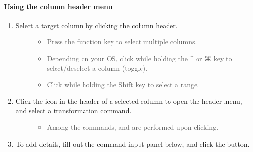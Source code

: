 \documentclass[letterpaper,10pt,english]{sphinxmanual}
\begin{document}
\paragraph{Using the column header menu}
\label{\detokenize{discovery/part07/edit_rules:id3}}\begin{enumerate}
\def\theenumi{\arabic{enumi}}
\def\labelenumi{\theenumi .}
\makeatletter\def\p@enumii{\p@enumi \theenumi .}\makeatother
\item {} 
Select a target column by clicking the column header.
\begin{quote}
\begin{itemize}
\item {} 
Press the function key to select multiple columns.

\item {} 
Depending on your OS, click while holding the \textasciicircum{} or ⌘ key to select/deselect a column (toggle).

\item {} 
Click while holding the Shift key to select a range.

\end{itemize}

\begin{figure}[H]
\centering

\noindent{}
\end{figure}
\end{quote}

\item {} 
Click the  icon in the header of a selected column to open the header menu, and select a transformation command.
\begin{quote}
\begin{itemize}
\item {} 
Among the commands,  and  are performed upon clicking.

\end{itemize}

\begin{figure}[H]
\centering

\noindent{}
\end{figure}
\end{quote}

\item {} 
To add details, fill out the command input panel below, and click the  button.
\begin{quote}


\end{quote}
\end{enumerate}
\end{document}
